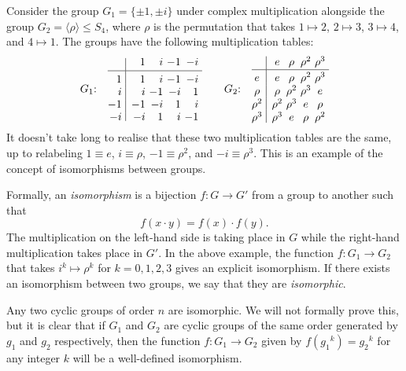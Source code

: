 Consider the group $G_1 = \{\pm 1, \pm i\}$ under complex multiplication alongside the group $G_2 = \langle\rho\rangle\leq S_4$, where $\rho$ is the permutation that takes $1\mapsto 2$, $2\mapsto 3$, $3\mapsto 4$, and $4\mapsto 1$. The groups have the following multiplication tables:
$$G_1{\rm :}\quad\vcenter{\vbox{\offinterlineskip
    \halign{
        \hfil $#$ & \hfil\vrule# \hfil \enskip &
        \hfil $#$ & \hfil $#$ & \hfil $#$ & \hfil $#$ \cr
        && 1 & i & -1 & -i \cr
        & height4pt &&& \cr
        \noalign{\hrule}
        & height4pt &&&\cr
        1 && 1 & i & -1 & -i \cr
        & height4pt &&&\cr
        i && i & -1 & -i & 1 \cr
        & height4pt &&&\cr
        -1 && -1 & -i & 1 & i \cr
        & height4pt &&&\cr
        -i && -i & 1 & i & -1 \cr
    }
}} \qquad
G_2{\rm :}\quad\vcenter{\vbox{\offinterlineskip
    \halign{
        \hfil $#$ \hfil & \hfil\vrule# \hfil \enskip &
        \hfil $#$ \hfil & \hfil $#$ \hfil & \hfil $#$ \hfil & \hfil $#$ \hfil \cr
        && e & \rho & \rho^2 & \rho^3 \cr
        & height2pt &&& \cr
        \noalign{\hrule}
        & height2pt &&&\cr
        e && e & \rho & \rho^2 & \rho^3 \cr
        & height2pt &&&\cr
        \rho && \rho & \rho^2 & \rho^3 & e \cr
        & height2pt &&&\cr
        \rho^2 && \rho^2 & \rho^3 & e & \rho \cr
        & height2pt &&&\cr
        \rho^3 && \rho^3 & e & \rho & \rho^2 \cr
    }
}}
$$
It doesn't take long to realise that these two multiplication tables are the same, up to relabeling $1 \equiv e$, $i\equiv \rho$, $-1 \equiv \rho^2$, and $-i \equiv \rho^3$. This is an example of the concept of isomorphisms between groups.

Formally, an {\it isomorphism} is a bijection $f:G\rightarrow G'$ from a group to another such that
$$f(x\cdot y) = f(x) \cdot f(y).$$
The multiplication on the left-hand side is taking place in $G$ while the right-hand multiplication takes place in $G'$. In the above example, the function $f : G_1 \rightarrow G_2$ that takes $i^k \mapsto \rho^k$ for $k=0,1,2,3$ gives an explicit isomorphism. If there exists an isomorphism between two groups, we say that they are {\it isomorphic}.

Any two cyclic groups of order $n$ are isomorphic. We will not formally prove this, but it is clear that if $G_1$ and $G_2$ are cyclic groups of the same order generated by $g_1$ and $g_2$ respectively, then the function $f : G_1 \rightarrow G_2$ given by $f({g_1}^k) = {g_2}^k$ for any integer $k$ will be a well-defined isomorphism.

